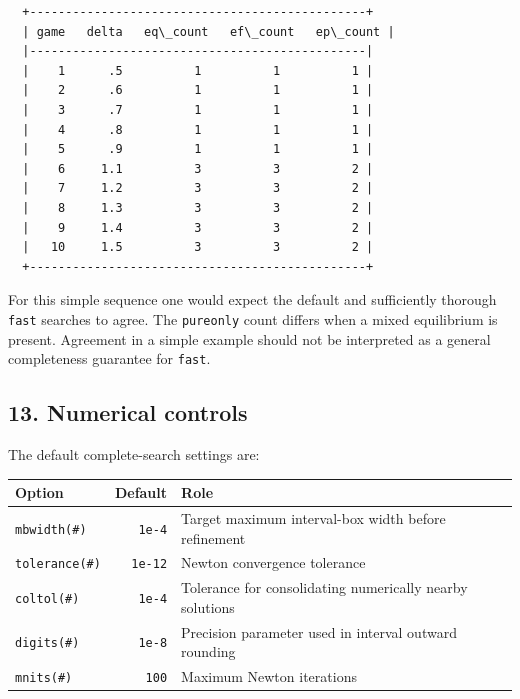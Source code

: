 \documentclass[11pt]{article}
\begin{document}
    \begin{Verbatim}[commandchars=\\\{\}]





  +-----------------------------------------------+
  | game   delta   eq\_count   ef\_count   ep\_count |
  |-----------------------------------------------|
  |    1      .5          1          1          1 |
  |    2      .6          1          1          1 |
  |    3      .7          1          1          1 |
  |    4      .8          1          1          1 |
  |    5      .9          1          1          1 |
  |    6     1.1          3          3          2 |
  |    7     1.2          3          3          2 |
  |    8     1.3          3          3          2 |
  |    9     1.4          3          3          2 |
  |   10     1.5          3          3          2 |
  +-----------------------------------------------+
    \end{Verbatim}

    For this simple sequence one would expect the default and sufficiently
thorough \texttt{fast} searches to agree. The \texttt{pureonly} count
differs when a mixed equilibrium is present. Agreement in a simple
example should not be interpreted as a general completeness guarantee
for \texttt{fast}.

    \hypertarget{numerical-controls}{%
\subsection{13. Numerical controls}\label{numerical-controls}}

The default complete-search settings are:

\begin{longtable}[]{@{}lrl@{}}
\toprule
Option & Default & Role \\
\midrule
\endhead
\texttt{mbwidth(\#)} & \texttt{1e-4} & Target maximum interval-box width
before refinement \\
\texttt{tolerance(\#)} & \texttt{1e-12} & Newton convergence
tolerance \\
\texttt{coltol(\#)} & \texttt{1e-4} & Tolerance for consolidating
numerically nearby solutions \\
\texttt{digits(\#)} & \texttt{1e-8} & Precision parameter used in
interval outward rounding \\
\texttt{mnits(\#)} & \texttt{100} & Maximum Newton iterations \\
\bottomrule
\end{longtable}
\end{document}
